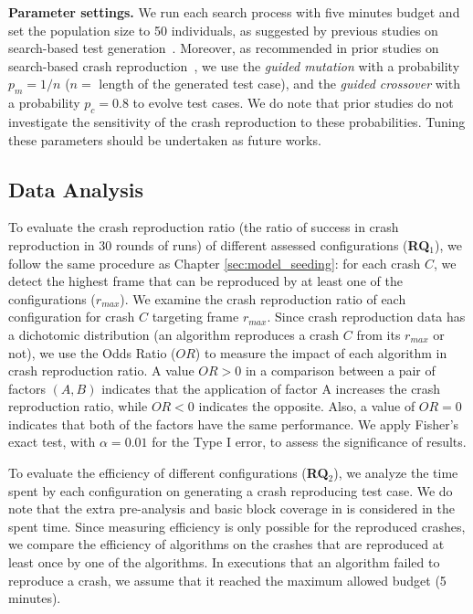 \textbf{Parameter settings. }
%
We run each search process with five minutes budget and set the population size to 50 individuals, as suggested by previous studies on search-based test generation~\cite{Panichella2018}. Moreover, as recommended in prior studies on search-based crash reproduction~\cite{Soltani2018a}, we use the \textit{guided mutation} with a probability $p_m=1/n$ ($n = $ length of the generated test case), and the \textit{guided crossover} with a probability $p_c=0.8$ to evolve test cases. We do note that prior studies do not investigate the sensitivity of the crash reproduction to these probabilities. Tuning these parameters should be undertaken as future works.


\subsection{Data Analysis}

To evaluate the crash reproduction ratio (\ie the ratio of success in crash reproduction in 30 rounds of runs) of different assessed configurations (\textbf{RQ$_1$}), we follow the same procedure as Chapter \ref{sec:model_seeding}: for each crash $C$, we detect the highest frame that can be reproduced by at least one of the configurations ($r_{max}$). 
We examine the crash reproduction ratio of each configuration for crash $C$ targeting frame $r_{max}$.
Since crash reproduction data has a dichotomic distribution (\ie an algorithm reproduces a crash $C$ from its $r_{max}$ or not), we use the Odds Ratio ($OR$) to measure the impact of each algorithm in crash reproduction ratio. A value $OR > 0$ in a comparison between a pair of factors $(A,B)$ indicates that the application of factor A increases the crash reproduction ratio, while $OR < 0$ indicates the opposite. Also, a value of $OR = 0$ indicates that both of the factors have the same performance.
We apply Fisher's exact test, with $\alpha = 0.01$ for the Type I error, to assess the significance of results. 

To evaluate the efficiency of different configurations (\textbf{RQ$_2$}), we analyze the time spent by each configuration on generating a crash reproducing test case.
We do note that the extra pre-analysis and basic block coverage in \bbc is considered in the spent time.
Since measuring efficiency is only possible for the reproduced crashes, we compare the efficiency of algorithms on the crashes that are reproduced at least once by one of the algorithms. 
In executions that an algorithm failed to reproduce a crash, we assume that it reached the maximum allowed budget (5 minutes).

